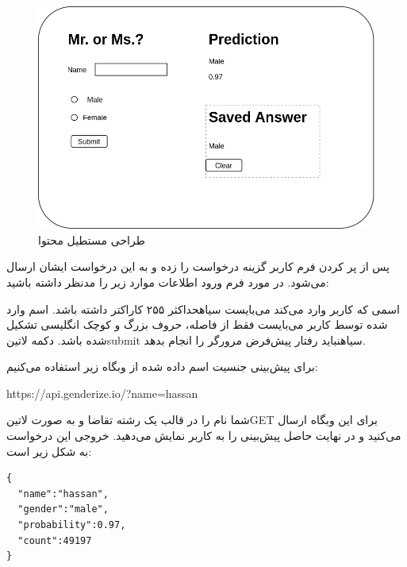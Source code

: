 \documentclass[../main.tex]{subfiles}
\begin{document}
\begin{figure}[h]
  \centering
  \includegraphics[scale=0.3]{./genderize-content}
  \caption{طراحی مستطیل محتوا}
\end{figure}

پس از پر کردن فرم کاربر گزینه درخواست را زده و به این درخواست ایشان ارسال می‌شود. در مورد فرم ورود اطلاعات موارد زیر را مدنظر داشته باشید:

 اسمی که کاربر وارد می‌کند می‌بایست ‌سیاه{حداکثر} ۲۵۵ کاراکتر داشته باشد.
 اسم وارد شده توسط کاربر می‌بایست فقط از فاصله، حروف بزرگ و کوچک انگلیسی تشکیل شده باشد.
 دکمه ‌لاتین{submit} ‌سیاه{نباید} رفتار پیش‌فرض مرورگر را انجام بدهد.

برای پیش‌بینی جنسیت اسم داده شده از وبگاه زیر استفاده می‌کنیم:

\begin{latin}\begin{center}
https://api.genderize.io/?name=hassan
\end{center}\end{latin}

شما نام را در قالب یک رشته تقاضا و به صورت ‌لاتین{GET} برای این وبگاه ارسال می‌کنید و در نهایت حاصل پیش‌بینی را به کاربر نمایش می‌دهید. خروجی این درخواست به شکل زیر است:

\begin{latin}
\begin{verbatim}
{
  "name":"hassan",
  "gender":"male",
  "probability":0.97,
  "count":49197
}
\end{verbatim}
\end{latin}
\end{document}
